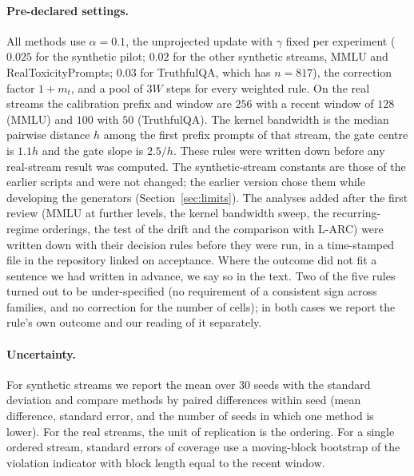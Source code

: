 \paragraph{Pre-declared settings.}
All methods use $\alpha=0.1$, the unprojected update with $\gamma$ fixed per experiment ($0.025$ for the synthetic pilot; $0.02$ for the other synthetic streams, MMLU and RealToxicityPrompts; $0.03$ for TruthfulQA, which has $n=817$), the correction factor $1+m_t$, and a pool of $3W$ steps for every weighted rule. On the real streams the calibration prefix and window are $256$ with a recent window of $128$ (MMLU) and $100$ with $50$ (TruthfulQA). The kernel bandwidth is the median pairwise distance $h$ among the first prefix prompts of that stream, the gate centre is $1.1h$ and the gate slope is $2.5/h$. These rules were written down before any real-stream result was computed. The synthetic-stream constants are those of the earlier scripts and were not changed; the earlier version chose them while developing the generators (Section~\ref{sec:limits}). The analyses added after the first review (MMLU at further levels, the kernel bandwidth sweep, the recurring-regime orderings, the test of the drift and the comparison with L-ARC) were written down with their decision rules before they were run, in a time-stamped file in the repository linked on acceptance. Where the outcome did not fit a sentence we had written in advance, we say so in the text. Two of the five rules turned out to be under-specified (no requirement of a consistent sign across families, and no correction for the number of cells); in both cases we report the rule's own outcome and our reading of it separately.

\paragraph{Uncertainty.}
For synthetic streams we report the mean over $30$ seeds with the standard deviation and compare methods by paired differences within seed (mean difference, standard error, and the number of seeds in which one method is lower). For the real streams, the unit of replication is the ordering. For a single ordered stream, standard errors of coverage use a moving-block bootstrap of the violation indicator with block length equal to the recent window.
